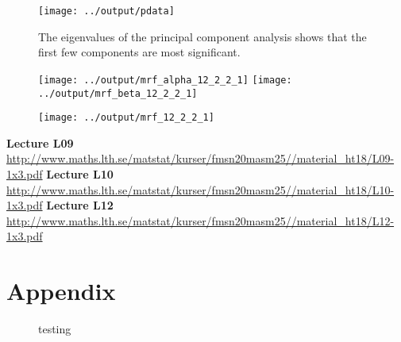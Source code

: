 \documentclass[a4paper,english]{article}
\newcommand{\sexion}[1]{\section{#1}}
\begin{document}
\begin{figure}[H]
	\centering
    \texttt{[image: ../output/pdata]}
    \caption{The eigenvalues of the principal component analysis shows that the first few components are most significant.}
    \label{fig:pca}
\end{figure}

\begin{figure}[H]
  \centering
  \texttt{[image: ../output/mrf\_alpha\_12\_2\_2\_1]}
  \texttt{[image: ../output/mrf\_beta\_12\_2\_2\_1]}
  \caption{}
  \label{fig:alphabeta}
\end{figure}

\begin{figure}[H]
	\centering
    \texttt{[image: ../output/mrf\_12\_2\_2\_1]}
    \caption{}
    \label{fig:mrf}
\end{figure}

\newpage

\begin{thebibliography}{37}
  \textbf{Lecture L09} \\
\url{http://www.maths.lth.se/matstat/kurser/fmsn20masm25//material_ht18/L09-1x3.pdf}
  \textbf{Lecture L10} \\
\url{http://www.maths.lth.se/matstat/kurser/fmsn20masm25//material_ht18/L10-1x3.pdf}
  \textbf{Lecture L12} \\
\url{http://www.maths.lth.se/matstat/kurser/fmsn20masm25//material_ht18/L12-1x3.pdf}
\end{thebibliography}
\pagebreak{}

\sexion{Appendix}
\begin{figure}[H]
  \centering
  \caption{testing}
  \label{fig:test}
\end{figure}


% 


\pagebreak{}
\thispagestyle{empty}
\end{document}
